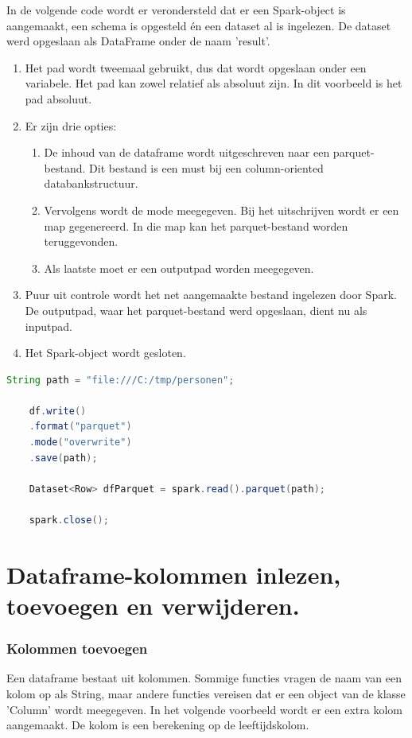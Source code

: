 \documentclass[a4paper,10pt,twoside]{report}
\begin{document}
In de volgende code wordt er verondersteld dat er een Spark-object is aangemaakt, een schema is opgesteld én een dataset al is ingelezen. De dataset werd opgeslaan als DataFrame onder de naam 'result'.

\begin{enumerate}
	\item Het pad wordt tweemaal gebruikt, dus dat wordt opgeslaan onder een variabele. Het pad kan zowel relatief als absoluut zijn. In dit voorbeeld is het pad absoluut.
	\item Er zijn drie opties:
	\begin{enumerate}
		\item De inhoud van de dataframe wordt uitgeschreven naar een parquet-bestand. Dit bestand is een must bij een column-oriented databankstructuur.
		\item Vervolgens wordt de mode meegegeven. Bij het uitschrijven wordt er een map gegenereerd. In die map kan het parquet-bestand worden teruggevonden.
		\item Als laatste moet er een outputpad worden meegegeven. 
	\end{enumerate}
	\item Puur uit controle wordt het net aangemaakte bestand ingelezen door Spark. De outputpad, waar het parquet-bestand werd opgeslaan, dient nu als inputpad.
	\item Het Spark-object wordt gesloten.
\end{enumerate}

\begin{lstlisting}[language=Java]
	String path = "file:///C:/tmp/personen";
	
	df.write()
	.format("parquet")
	.mode("overwrite")
	.save(path);
	
	Dataset<Row> dfParquet = spark.read().parquet(path);
	
	spark.close();
\end{lstlisting}

\section{Dataframe-kolommen inlezen, toevoegen en verwijderen.}

\subsubsection{Kolommen toevoegen}
Een dataframe bestaat uit kolommen. Sommige functies vragen de naam van een kolom op als String, maar andere functies vereisen dat er een object van de klasse 'Column' wordt meegegeven. In het volgende voorbeeld wordt er een extra kolom aangemaakt. De kolom is een berekening op de leeftijdskolom. 
\end{document}
